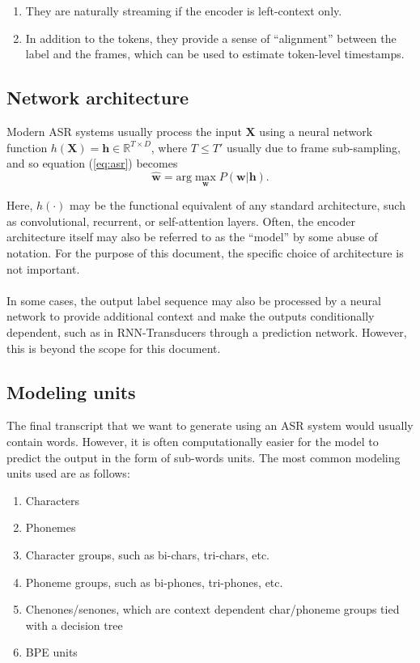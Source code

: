 \begin{enumerate}
    \item They are naturally streaming if the encoder is left-context only.
    \item In addition to the tokens, they provide a sense of ``alignment'' between the label and the frames, which can be used to estimate token-level timestamps.
\end{enumerate}

\subsection{Network architecture}

Modern ASR systems usually process the input $\mathbf{X}$ using a neural network function $h(\mathbf{X}) = \mathbf{h} \in \mathbb{R}^{T\times D}$, where $T \leq T'$ usually due to frame sub-sampling, and so equation (\ref{eq:asr}) becomes
%
\begin{equation}
    \hat{\mathbf{w}} = \text{arg}\max_{\mathbf{w}} P(\mathbf{w}|\mathbf{h}).
\end{equation}

Here, $h(\cdot)$ may be the functional equivalent of any standard architecture, such as convolutional, recurrent, or self-attention layers. 
%
Often, the encoder architecture itself may also be referred to as the ``model'' by some abuse of notation. 
%
For the purpose of this document, the specific choice of architecture is not important.

\paragraph{} In some cases, the output label sequence may also be processed by a neural network to provide additional context and make the outputs conditionally dependent, such as in RNN-Transducers through a prediction network. 
%
However, this is beyond the scope for this document.

\subsection{Modeling units}

The final transcript that we want to generate using an ASR system would usually contain words. 
%
However, it is often computationally easier for the model to predict the output in the form of sub-words units. 
%
The most common modeling units used are as follows:

\begin{enumerate}
    \item Characters
    \item Phonemes
    \item Character groups, such as bi-chars, tri-chars, etc.
    \item Phoneme groups, such as bi-phones, tri-phones, etc.
    \item Chenones/senones, which are context dependent char/phoneme groups tied with a decision tree
    \item BPE units
\end{enumerate}

